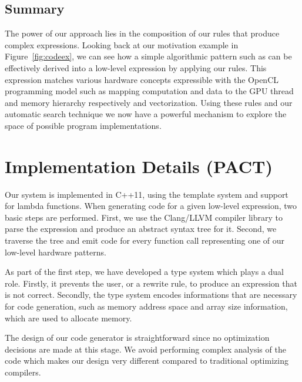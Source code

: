 \subsection{Summary}

The power of our approach lies in the composition of our rules that produce complex expressions.
Looking back at our motivation example in Figure~\ref{fig:codeex}, we can see how a simple algorithmic pattern such as  can be effectively derived into a low-level expression by applying our rules.
This expression matches various hardware concepts expressible with the OpenCL programming model such as mapping computation and data to the GPU thread and memory hierarchy respectively and vectorization.
Using these rules and our automatic search technique we now have a powerful mechanism to explore the space of possible program implementations.


\section{Implementation Details (PACT)}

Our system is implemented in C++11, using the template system and support for lambda functions. 
When generating code for a given low-level expression, two basic steps are performed.
First, we use the Clang/LLVM compiler library to parse the expression and produce an abstract syntax tree for it.
Second, we traverse the tree and emit code for every function call representing one of our low-level hardware patterns.

As part of the first step, we have developed a type system which plays a dual role.
Firstly, it prevents the user, or a rewrite rule, to produce an expression that is not correct.
Secondly, the type system encodes informations that are necessary for code generation, such as memory address space and array size information, which are used to allocate memory.

The design of our code generator is straightforward since no optimization decisions are made at this stage.
We avoid performing complex analysis of the code which makes our design very different compared to traditional optimizing compilers.


